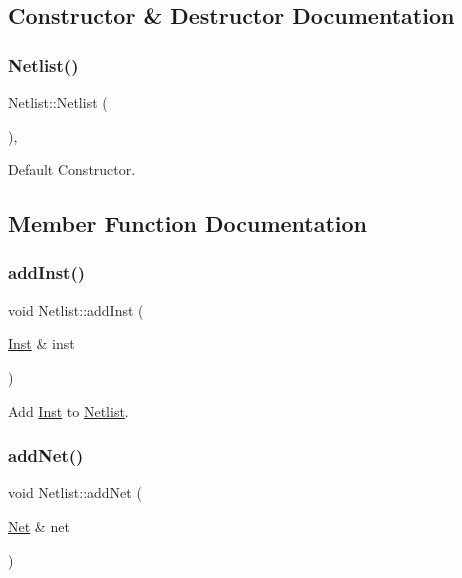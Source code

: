 \subsection{Constructor \& Destructor Documentation}
\mbox{\label{classNetlist_a946b08b1adb8999f1cff352f5e9b588b}} 
\subsubsection{\texorpdfstring{Netlist()}{Netlist()}}
{\footnotesize\ttfamily Netlist\+::\+Netlist (\begin{DoxyParamCaption}{ }\end{DoxyParamCaption})\hspace{0.3cm}{\ttfamily [explicit]}, {\ttfamily [default]}}



Default Constructor. 



\subsection{Member Function Documentation}
\mbox{\label{classNetlist_a9214addbaff42dc7041509529d0ccb3c}} 
\subsubsection{\texorpdfstring{add\+Inst()}{addInst()}}
{\footnotesize\ttfamily void Netlist\+::add\+Inst (\begin{DoxyParamCaption}\item[{\hyperlink{classInst}{Inst} \&}]{inst }\end{DoxyParamCaption})\hspace{0.3cm}{\ttfamily [inline]}}



Add \hyperlink{classInst}{Inst} to \hyperlink{classNetlist}{Netlist}. 

\mbox{\label{classNetlist_ab26277ae8a5f0ef605709c27e63c5492}} 
\subsubsection{\texorpdfstring{add\+Net()}{addNet()}}
{\footnotesize\ttfamily void Netlist\+::add\+Net (\begin{DoxyParamCaption}\item[{\hyperlink{classNet}{Net} \&}]{net }\end{DoxyParamCaption})\hspace{0.3cm}{\ttfamily [inline]}}



